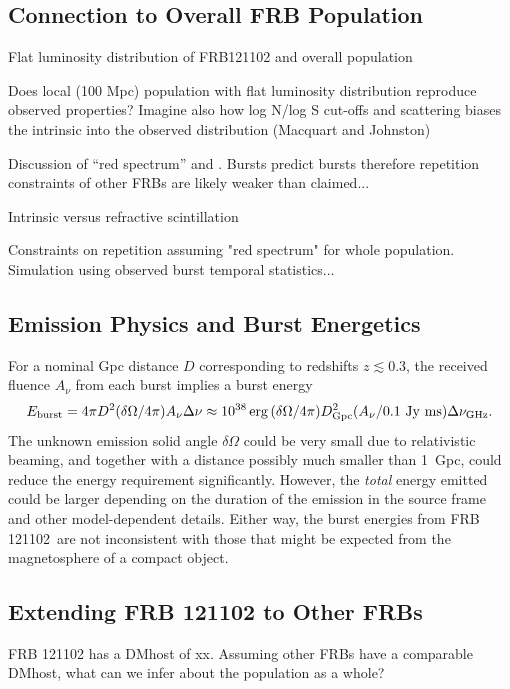 \documentclass{emulateapj}
\newcommand{\frb}{FRB 121102}
\begin{document}
\subsection{Connection to Overall FRB Population}

Flat luminosity distribution of FRB121102 and overall population

Does local (100 Mpc) population with flat luminosity distribution reproduce observed properties? Imagine also how log N/log S cut-offs and scattering biases the intrinsic into the observed distribution (Macquart and Johnston)

Discussion of ``red spectrum'' and \citet{2016MNRAS.458L..89C}. Bursts predict bursts therefore repetition constraints of other FRBs are likely weaker than claimed...

Intrinsic versus refractive scintillation

Constraints on repetition assuming "red spectrum" for whole population. Simulation using observed burst temporal statistics...


\subsection{Emission Physics and Burst Energetics}

For a nominal Gpc distance $D$ corresponding to redshifts $z\lesssim 0.3$, the received fluence $A_{\nu}$ from each burst implies  a burst energy
$$E_{\rm burst} = 4\pi D^2 (\delta\Omega/4\pi) A_{\nu} \Delta\nu
\approx 10^{38}\, {\rm erg}\,(\delta\Omega/4\pi) D_{\rm Gpc}^2  (A_{\nu} / 0.1\ {\rm Jy\ ms}) \Delta\nu_{\rm GHz}.$$
The unknown  emission solid angle $\delta\Omega$
could be very small due to relativistic beaming, and together with a distance possibly much smaller than 1~Gpc, could reduce the energy requirement significantly.  However, the {\it total} energy emitted could be larger depending on the duration of the emission in the source frame and other model-dependent details.
Either way, the burst energies from \frb\ are not inconsistent with those that might be expected from the magnetosphere of a compact object\cite{cw16}.

\subsection{Extending FRB 121102 to Other FRBs}

FRB 121102 has a DMhost of xx. Assuming other FRBs have a comparable DMhost, what can we infer about the population as a whole?
\end{document}
